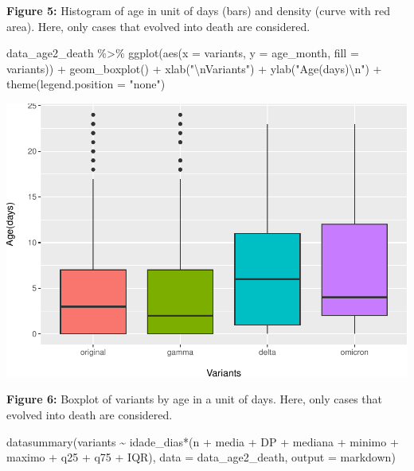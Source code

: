\documentclass[
]{article}
\newenvironment{Shaded}{\begin{snugshade}}{\end{snugshade}}
\newcommand{\AttributeTok}[1]{\textcolor[rgb]{0.77,0.63,0.00}{#1}}
\newcommand{\FunctionTok}[1]{\textcolor[rgb]{0.00,0.00,0.00}{#1}}
\newcommand{\NormalTok}[1]{#1}
\newcommand{\SpecialCharTok}[1]{\textcolor[rgb]{0.00,0.00,0.00}{#1}}
\newcommand{\StringTok}[1]{\textcolor[rgb]{0.31,0.60,0.02}{#1}}
\renewenvironment{Shaded}{\begin{mdframed}[ backgroundcolor=shadecolor, linecolor = shadecolor, leftmargin=\dimexpr\leftmargin-2pt\relax, innerleftmargin=1.6pt, innertopmargin=5pt, skipabove=10pt,skipbelow=3pt ]}{\end{mdframed}}
\begin{document}
\textbf{Figure 5:} Histogram of age in unit of days (bars) and density
(curve with red area). Here, only cases that evolved into death are
considered.

\begin{Shaded}
\begin{Highlighting}[]
\NormalTok{data\_age2\_death }\SpecialCharTok{\%\textgreater{}\%} 
  \FunctionTok{ggplot}\NormalTok{(}\FunctionTok{aes}\NormalTok{(}\AttributeTok{x =}\NormalTok{ variants,}
             \AttributeTok{y =}\NormalTok{ age\_month,}
             \AttributeTok{fill =}\NormalTok{ variants)) }\SpecialCharTok{+}
  \FunctionTok{geom\_boxplot}\NormalTok{() }\SpecialCharTok{+}
  \FunctionTok{xlab}\NormalTok{(}\StringTok{"}\SpecialCharTok{\textbackslash{}n}\StringTok{Variants"}\NormalTok{) }\SpecialCharTok{+}
  \FunctionTok{ylab}\NormalTok{(}\StringTok{"Age(days)}\SpecialCharTok{\textbackslash{}n}\StringTok{"}\NormalTok{) }\SpecialCharTok{+}
  \FunctionTok{theme}\NormalTok{(}\AttributeTok{legend.position =} \StringTok{"none"}\NormalTok{)}
\end{Highlighting}
\end{Shaded}

\includegraphics{age_analysis_files/figure-latex/unnamed-chunk-13-1.pdf}

\textbf{Figure 6:} Boxplot of variants by age in a unit of days. Here,
only cases that evolved into death are considered.

\begin{Shaded}
\begin{Highlighting}[]
\FunctionTok{datasummary}\NormalTok{(variants }\SpecialCharTok{\textasciitilde{}}\NormalTok{ idade\_dias}\SpecialCharTok{*}\NormalTok{(n }\SpecialCharTok{+}\NormalTok{ media }\SpecialCharTok{+}\NormalTok{ DP }\SpecialCharTok{+}\NormalTok{ mediana }\SpecialCharTok{+}\NormalTok{ minimo }\SpecialCharTok{+}
\NormalTok{                                   maximo }\SpecialCharTok{+}\NormalTok{ q25 }\SpecialCharTok{+}\NormalTok{ q75 }\SpecialCharTok{+}\NormalTok{ IQR), }
            \AttributeTok{data =}\NormalTok{ data\_age2\_death, }\AttributeTok{output =} \StringTok{\textquotesingle{}markdown\textquotesingle{}}\NormalTok{)}
\end{Highlighting}
\end{Shaded}
\end{document}
